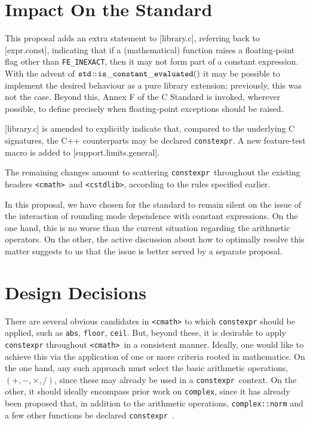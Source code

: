 \documentclass[prd,twocolumn,amsmath,amssymb,nofootinbib,eqsecnum]{revtex4-1}
\newcommand{\constexpr}{\code{constexpr}\xspace}
\newcommand{\code}[1]{{\tt #1}}
\newcommand{\header}[1]{{\tt <#1>}}
\newcommand{\cmath}{\header{cmath}}
\newcommand{\FEINEXACT}{{\tt FE\_INEXACT}}
\begin{document}
\section{Impact On the Standard}
\label{sec:impact}

This proposal adds an extra statement to [library.c], referring back to [expr.const], indicating that if a (mathematical) function raises a floating-point flag other than \FEINEXACT, then it may not form part of a constant expression. With the advent of $\code{std\!::\!is\_constant\_evaluated()}$ it may be possible to implement the desired behaviour as a pure library extension; previously, this was not the case. Beyond this, Annex F of the C Standard is invoked, wherever possible, to define precisely when floating-point exceptions should be raised.

[library.c] is amended to explicitly indicate that, compared to the underlying C signatures, the C++ counterparts may be declared \constexpr. A new feature-test macro is added to [support.limits.general].

The remaining changes amount to scattering \constexpr\ throughout the existing headers \cmath\ and \header{cstdlib}, according to the rules specified earlier. 

In this proposal, we have chosen for the standard to remain silent on the issue of the interaction of rounding mode dependence with constant expressions. On the one hand, this is no worse than the current situation regarding the arithmetic operators. On the other, the active discussion about how to optimally resolve this matter suggests to us that the issue is better served by a separate proposal.

\section{Design Decisions}
\label{sec:dd}

There are several obvious candidates in \header{cmath} to which \constexpr should be applied, such as \code{abs}, \code{floor}, \code{ceil}.  But, beyond these, it is desirable to
apply \constexpr throughout \cmath\ in a consistent manner. Ideally, one would like to achieve this via the application of one or more criteria rooted in mathematics. On the one hand, any such approach must
select the
basic arithmetic operations, $(+,-,\times,/)$, since these may already be used in a 
\constexpr\ context. On the other,  it should ideally encompass prior work on \code{complex}, since it has already been proposed that, in addition to the arithmetic operations, \code{complex::norm} and a few other functions be declared \constexpr~\cite{AP-complex}. 
\end{document}

